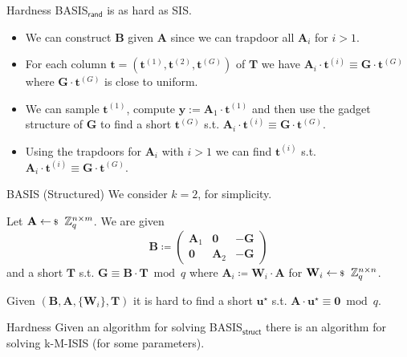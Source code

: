 \documentclass[xcolor=table,10pt,aspectratio=169]{beamer}
\renewcommand{\vec}[1]{\ensuremath{\mathbf{#1}}\xspace}
\providecommand{\mat}[1]{\ensuremath{\vec{#1}}\xspace}
\begin{document}
\begin{frame}[label={sec:orga080dc1}]{Hardness}
BASIS\(_\mathsf{rand}\) is as hard as SIS.

\begin{itemize}
\item We can construct \(\vec{B}\) given \(\mat{A}\) since we can trapdoor all \(\mat{A}_{i}\) for \(i > 1\).

\item For each column \(\vec{t} = (\vec{t}^{(1)}, \vec{t}^{(2)}, \vec{t}^{(G)})\) of \(\vec{T}\) we have \(\mat{A}_{i} \cdot \vec{t}^{(i)} \equiv \vec{G} \cdot \vec{t}^{(G)}\) where \(\vec{G} \cdot \vec{t}^{(G)}\) is close to uniform.
\item We can sample \(\vec{t}^{(1)}\), compute \(\vec{y} := \mat{A}_{1} \cdot \vec{t}^{(1)}\) and then use the gadget structure of \(\vec{G}\) to find a short \(\vec{t}^{(G)}\) s.t. \(\mat{A}_{i} \cdot \vec{t}^{(i)} \equiv \vec{G} \cdot \vec{t}^{(G)}\).
\item Using the trapdoors for \(\mat{A}_{i}\) with \(i>1\) we can find \(\vec{t}^{(i)}\) s.t. \(\mat{A}_{i} \cdot \vec{t}^{(i)} \equiv \vec{G} \cdot \vec{t}^{(G)}\).
\end{itemize}
\end{frame}

\begin{frame}[label={sec:orga2faac2}]{BASIS (Structured)}
We consider \(k=2\), for simplicity.

\begin{definition}
Let \(\mat{A} \sample \ZZ_{q}^{n \times m}\). We are given
\[\vec{B} \coloneqq \begin{pmatrix}
\mat{A}_{1} & \vec{0} & - \vec{G}\\
\vec{0} & \mat{A}_{2} & -\vec{G}
\end{pmatrix}
\] and a short \(\vec{T}\) s.t. \(\vec{G} \equiv \vec{B} \cdot \vec{T} \bmod q\)
where \(\mat{A}_{i} \coloneqq  \vec{W}_{i} \cdot \mat{A}\) for \(\vec{W}_{i} \sample \ZZ_{q}^{n \times n}\).

Given \((\vec{B}, \mat{A}, \{\mat{W}_{i}\}, \vec{T})\) it is hard to find a short \(\vec{u}^{\star}\) s.t. \(\mat{A} \cdot \vec{u}^{\star} \equiv \vec{0} \bmod q\).
\end{definition}

{\footnotesize {} \par}
\end{frame}

\begin{frame}[label={sec:org776e8c5}]{Hardness}
Given an algorithm for solving BASIS\(_\mathsf{struct}\) there is an algorithm for solving k-M-ISIS (for some parameters).
\end{frame}
\end{document}
